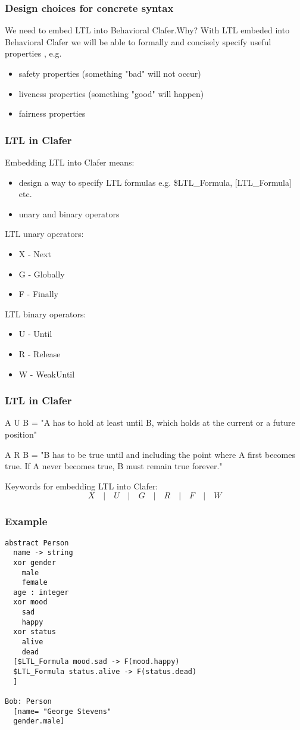 \documentclass[xcolor=dvipsnames,12pt]{beamer}
\begin{document}
	\begin{frame}
    \frametitle{Design choices for concrete syntax}
    	We need to embed LTL into Behavioral Clafer.Why? With LTL embeded into Behavioral Clafer we will be able to formally and concisely specify useful properties , e.g.
    \begin{itemize}
      \item{safety properties (something "bad" will not occur)}
      \item{liveness properties (something "good" will happen)}
      \item{fairness properties}
    \end{itemize}
	\end{frame}

    \begin{frame}
      \frametitle{LTL in Clafer}
      Embedding LTL into Clafer means:
\begin{itemize}
  \item design a way to specify LTL formulas e.g. \$LTL\_Formula, [LTL\_Formula] etc.
  \item unary and binary operators
\end{itemize}

LTL unary operators:
\begin{itemize}
  \item X - Next 
  \item G - Globally 
  \item F - Finally 
\end{itemize}

LTL binary operators:
\begin{itemize}
  \item U - Until 
  \item R - Release
  \item W - WeakUntil
\end{itemize}
\end{frame}

    \begin{frame}
      \frametitle{LTL in Clafer}
A U B = "A has to hold at least until B, which holds at the current or a future position"

A R B = "B has to be true until and including the point where A first becomes true. If A never becomes true, B must remain true forever." 

Keywords for embedding LTL into Clafer:
\[X \quad | \quad U  \quad | \quad  G \quad | \quad R \quad  |\quad F \quad | \quad W\]
   \end{frame}

   \begin{frame}[fragile]
     \frametitle{Example}
\begin{verbatim}
abstract Person
  name -> string
  xor gender
    male
    female
  age : integer
  xor mood
    sad
    happy
  xor status
    alive
    dead
  [$LTL_Formula mood.sad -> F(mood.happy)
  $LTL_Formula status.alive -> F(status.dead)
  ]

Bob: Person
  [name= "George Stevens"
  gender.male]
\end{verbatim}
\end{frame}
\end{document}
